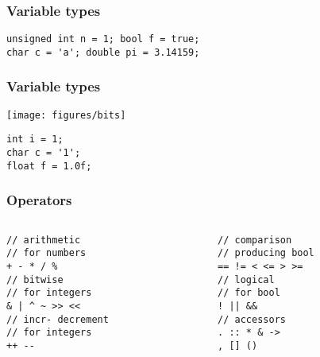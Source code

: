 \begin{frame}[fragile]
\frametitle{Variable types}
\begin{lstlisting}
unsigned int n = 1; bool f = true;
char c = 'a'; double pi = 3.14159;
\end{lstlisting}
\end{frame}

\begin{frame}[fragile]
\frametitle{Variable types}
\begin{center}
\texttt{[image: figures/bits]}
\end{center}
\lstset{
	xleftmargin=3cm
}
\begin{lstlisting}
int i = 1;
char c = '1';
float f = 1.0f;
\end{lstlisting}
\end{frame}

\begin{frame}[fragile]
\frametitle{Operators}
\begin{columns}[c]
  \begin{column}{0.5\textwidth}
\begin{lstlisting}
// arithmetic
// for numbers
+ - * / %
// bitwise
// for integers
& | ^ ~ >> <<
// incr- decrement
// for integers
++ --
\end{lstlisting}
  \end{column}
  \begin{column}{0.5\textwidth}
\begin{lstlisting}
// comparison
// producing bool
== != < <= > >=
// logical
// for bool
! || &&
// accessors
. :: * & ->
, [] ()
\end{lstlisting}
  \end{column}
\end{columns}
\end{frame}

